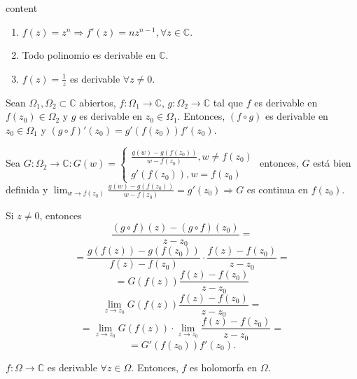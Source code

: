 \begin{dem}
  content
\end{dem}

\begin{ejm}
  \begin{enumerate}[label=(\roman*)]
    \item $f(z) = z^{n} \Rightarrow f'(z) = n z^{n-1}, \forall z \in \mathbb{C}$.
    \item Todo polinomio es derivable en $\mathbb{C}$.
    \item $f(z) = \frac{1}{z}$ es derivable $\forall z \neq 0$.
  \end{enumerate}
\end{ejm}

\begin{theo}
  Sean $\Omega_{1}, \Omega_{2} \subset \mathbb{C}$ abiertos, $ f: \Omega_{1} \to \mathbb{C}$, $g: \Omega_{2} \to \mathbb{C}$ tal que $f$ es derivable en $f(z_{0}) \in \Omega_{2}$ y $g$ es derivable en $z_{0} \in \Omega_{1}$. Entonces, $(f \circ g)$ es derivable en $z_{0} \in \Omega_{1}$ y $(g \circ f)'(z_{0}) = g'(f(z_{0}))f'(z_{0})$.
\end{theo}

\begin{dem}
  Sea $G: \Omega_{2} \to \mathbb{C} : G(w) =
  \begin{cases}
    \frac{g(w) - g(f(z_{0}))}{w - f(z_{0})}, w \neq f(z_{0}) \\
    g'(f(z_{0})), w=f(z_{0})
  \end{cases}$
  entonces, $G$ está bien definida y $ \lim_{w \to f(z_{0})} \frac{g(w) - g(f(z_{0}))}{w - f(z_{0})} = g'(z_{0}) \Rightarrow G$ es continua en $f(z_{0})$.

  Si $z \neq 0$, entonces
  \[
    \frac{(g \circ f)(z) - (g \circ f)(z_{0})}{z - z_{0}} = 
  \] 
  \[ = \frac{g(f(z)) - g(f(z_{0}))}{f(z) - f(z_{0})} \cdot \frac{f(z)-f(z_{0})}{z - z_{0}} =
  \] 
  \[
    = G(f(z)) \frac{f(z) - f(z_{0})}{z-z_{0}}
  \]
  \[ 
    \lim_{z \to z_{0}} G(f(z)) \frac{f(z) - f(z_{0})}{z-z_{0}} =
  \] 
  \[ 
    = \lim_{z \to z_{0}} G(f(z)) \cdot \lim_{z \to z_{0}} \frac{f(z) - f(z_{0})}{z -z_{0}} = 
  \]
  \[
    =G'(f(z_{0}))f'(z_{0}) .
  \] 
\end{dem}

\begin{obs}
  $f: \Omega \to \mathbb{C}$ es derivable $\forall z \in \Omega$. Entonces, $f$ es holomorfa en $\Omega$.
\end{obs}
